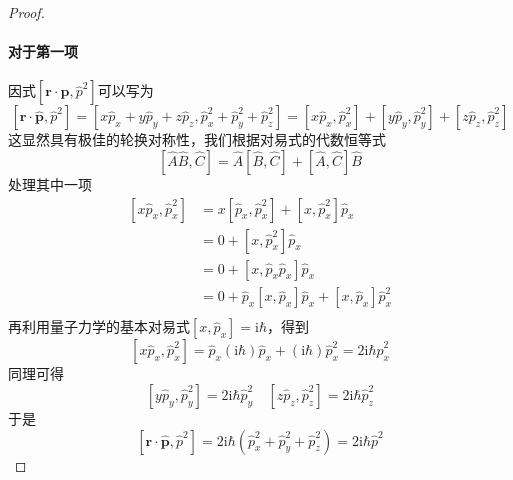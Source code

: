 \begin{proof}
    \paragraph{对于第一项}
    因式$\left[\boldsymbol{r}\cdot\boldsymbol{p}, \hat{p}^2\right]$可以写为
    $$
        \left[\boldsymbol{r}\cdot\hat{\boldsymbol{p}}, \hat{p}^2\right]
        =\left[x\hat{p}_x + y\hat{p}_y + z\hat{p}_z, \hat{p}_x^2+\hat{p}_y^2+\hat{p}_z^2\right]
        =\left[x\hat{p}_x, \hat{p}_x^2\right] + \left[y\hat{p}_y, \hat{p}_y^2\right] + \left[z\hat{p}_z, \hat{p}_z^2\right]
    $$
    这显然具有极佳的轮换对称性，我们根据对易式的代数恒等式
    $$
        \left[\hat{A}\hat{B}, \hat{C}\right]=\hat{A}\left[\hat{B}, \hat{C}\right]+\left[\hat{A}, \hat{C}\right]\hat{B}
    $$
    处理其中一项
    $$
        \begin{aligned}
            \left[x\hat{p}_x, \hat{p}_x^2\right]
             & =x\left[\hat{p}_x, \hat{p}_x^2\right] + \left[x, \hat{p}_x^2\right]\hat{p}_x            \\
             & =0 + \left[x, \hat{p}_x^2\right]\hat{p}_x                                               \\
             & =0 + \left[x, \hat{p}_x\hat{p}_x\right]\hat{p}_x                                        \\
             & =0 + \hat{p}_x\left[x, \hat{p}_x\right]\hat{p}_x + \left[x, \hat{p}_x\right]\hat{p}_x^2 \\
        \end{aligned}
    $$
    再利用量子力学的基本对易式$[x, \hat{p}_x]=\mathrm{i}\hbar$，得到
    $$
        \left[x\hat{p}_x, \hat{p}_x^2\right]
        =\hat{p}_x(\mathrm{i}\hbar)\hat{p}_x + (\mathrm{i}\hbar)\hat{p}_x^2
        =2\mathrm{i}\hbar\hat{p}_x^2
    $$
    同理可得
    $$
        \left[y\hat{p}_y, \hat{p}_y^2\right] = 2\mathrm{i}\hbar\hat{p}_y^2 \quad
        \left[z\hat{p}_z, \hat{p}_z^2\right] = 2\mathrm{i}\hbar\hat{p}_z^2
    $$
    于是
    $$
        \left[\boldsymbol{r}\cdot\hat{\boldsymbol{p}}, \hat{p}^2\right] = 2\mathrm{i}\hbar\left(\hat{p}_x^2 + \hat{p}_y^2 + \hat{p}_z^2\right)
        =2\mathrm{i}\hbar\hat{p}^2
    $$

\end{proof}
